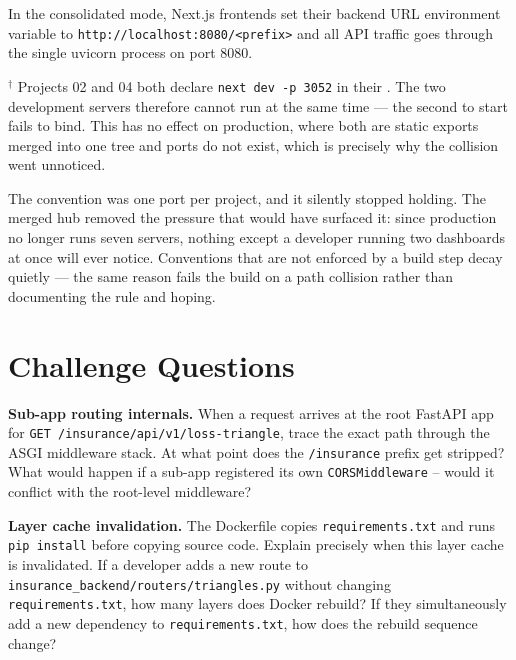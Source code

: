 In the consolidated mode, Next.js frontends set their backend URL environment variable to \texttt{http://localhost:8080/<prefix>} and all API traffic goes through the single uvicorn process on port 8080.

$^\dagger$ Projects 02 and 04 both declare \texttt{next dev -p 3052} in their
. The two development servers therefore cannot run at the
same time --- the second to start fails to bind. This has no effect on
production, where both are static exports merged into one tree and ports do not
exist, which is precisely why the collision went unnoticed.

\begin{keyinsight}
The convention was one port per project, and it silently stopped holding. The
merged hub removed the pressure that would have surfaced it: since production no
longer runs seven servers, nothing except a developer running two dashboards at
once will ever notice. Conventions that are not enforced by a build step decay
quietly --- the same reason  fails the build on a
path collision rather than documenting the rule and hoping.
\end{keyinsight}

\section{Challenge Questions}
\label{sec:infra-challenges}

\begin{challengebox}
\textbf{Sub-app routing internals.} When a request arrives at the root FastAPI app for \texttt{GET /insurance/api/v1/loss-triangle}, trace the exact path through the ASGI middleware stack. At what point does the \texttt{/insurance} prefix get stripped? What would happen if a sub-app registered its own \texttt{CORSMiddleware} -- would it conflict with the root-level middleware?
\end{challengebox}

\begin{challengebox}
\textbf{Layer cache invalidation.} The Dockerfile copies \texttt{requirements.txt} and runs \texttt{pip install} before copying source code. Explain precisely when this layer cache is invalidated. If a developer adds a new route to \texttt{insurance\_backend/routers/triangles.py} without changing \texttt{requirements.txt}, how many layers does Docker rebuild? If they simultaneously add a new dependency to \texttt{requirements.txt}, how does the rebuild sequence change?
\end{challengebox}

